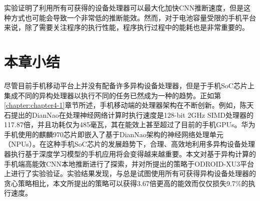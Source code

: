 实验证明了利用所有可获得的设备处理器可以最大化加快CNN推断速度，但是这种方式也可能会导致一个非常低的推断能效。然而，对于电池容量受限的手机平台来说，除了需要关注程序的执行性能，程序执行过程中的能耗也是非常重要的\cite{brooks2000power}。

\section{本章小结}

尽管目前手机移动平台上并没有配备许多异构设备处理器，但是于手机SoC芯片上集成不同的异构处理器以执行不同的任务已然成为一种的趋势。正如第\ref{chapter:chapter4-1}章节所述，手机移动端的处理器架构在不断创新。例如，陈天石提出的DianNao在处理神经网络计算时执行速度是128-bit 2GHz SIMD处理器的117.87倍，并且功耗仅为485毫瓦\cite{chen2014diannao}，其在能效上甚至超过了目前的手机GPUs。华为手机使用的麒麟970芯片即嵌入了基于DianNao架构的神经网络处理单元（NPUs）。在这种手机SoC芯片的发展趋势下，合理、高效地利用多异构设备处理器执行基于深度学习模型的手机应用将会变得越来越重要。本文对基于异构计算的手机端高能效CNN本地推断进行了探索，并对所提出的策略于ODROID-XU3平台上进行了实验验证。实验结果发现，与总是试图使用所有可获得异构设备处理器的贪心策略相比，本文所提出的策略可以获得3.67倍更高的能效而仅仅损失9.7\%的执行速度。 